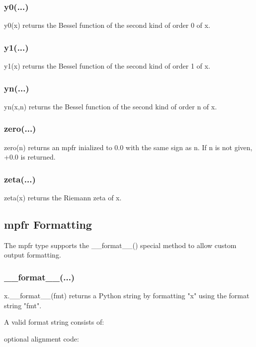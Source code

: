 \subsubsection{y0(...)}

y0(x) returns the Bessel function of the second kind of order 0 of x.

\subsubsection{y1(...)}

y1(x) returns the Bessel function of the second kind of order 1 of x.

\subsubsection{yn(...)}

yn(x,n) returns the Bessel function of the second kind of order n of x.

\subsubsection{zero(...)}

zero(n) returns an mpfr inialized to 0.0 with the same sign as n. If n is not given, +0.0 is
returned.

\subsubsection{zeta(...)}

zeta(x) returns the Riemann zeta of x.



\subsection{mpfr Formatting}


The mpfr type supports the \_\_format\_\_() special method to allow custom output formatting.

\subsubsection{\_\_format\_\_(...)}


x.\_\_format\_\_(fmt) returns a Python string by formatting "x" using the format string "fmt". 

A valid format string consists of:

optional alignment code:

